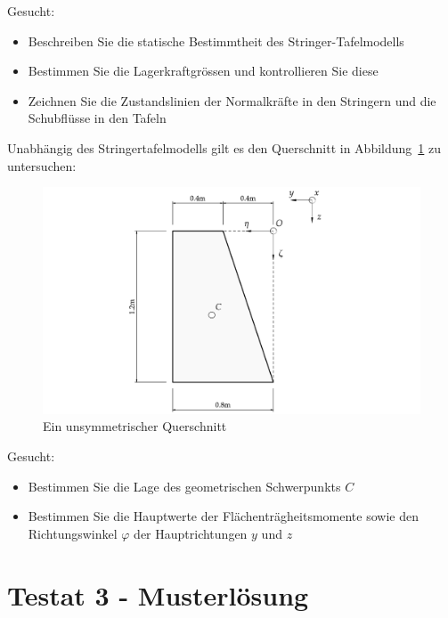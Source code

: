 \documentclass[
  12pt,
  letterpaper,
  DIV=11,
  egregdoesnotlikesansseriftitles]{scrartcl}
\providecommand{\tightlist}{%
  \setlength{\itemsep}{0pt}\setlength{\parskip}{0pt}}\usepackage{longtable,booktabs,array}
\begin{document}
Gesucht:

\begin{itemize}
\tightlist
\item
  Beschreiben Sie die statische Bestimmtheit des Stringer-Tafelmodells
\item
  Bestimmen Sie die Lagerkraftgrössen und kontrollieren Sie diese
\item
  Zeichnen Sie die Zustandslinien der Normalkräfte in den Stringern und
  die Schubflüsse in den Tafeln
\end{itemize}

\newpage{}

Unabhängig des Stringertafelmodells gilt es den Querschnitt in
Abbildung~\ref{fig-qs} zu untersuchen:

\begin{figure}[H]

{\centering \includegraphics{BSI_HS23_Testat_03_files/mediabag/../images/Testat_03_HS23_QS.pdf}

}

\caption{\label{fig-qs}Ein unsymmetrischer Querschnitt}

\end{figure}

Gesucht:

\begin{itemize}
\tightlist
\item
  Bestimmen Sie die Lage des geometrischen Schwerpunkts \(C\)
\item
  Bestimmen Sie die Hauptwerte der Flächenträgheitsmomente sowie den
  Richtungswinkel \(\varphi\) der Hauptrichtungen \(y\) und \(z\)
\end{itemize}

\newpage{}

\hypertarget{testat-3---musterluxf6sung}{%
\section{Testat 3 - Musterlösung}\label{testat-3---musterluxf6sung}}
\end{document}
